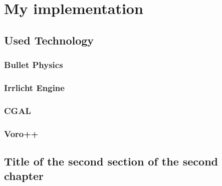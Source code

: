 \chapter{My implementation}

\section{Used Technology}
\subsection{Bullet Physics}
\subsection{Irrlicht Engine}
\subsection{CGAL}
\subsection{Voro++}


\section{Title of the second section of the second chapter}
